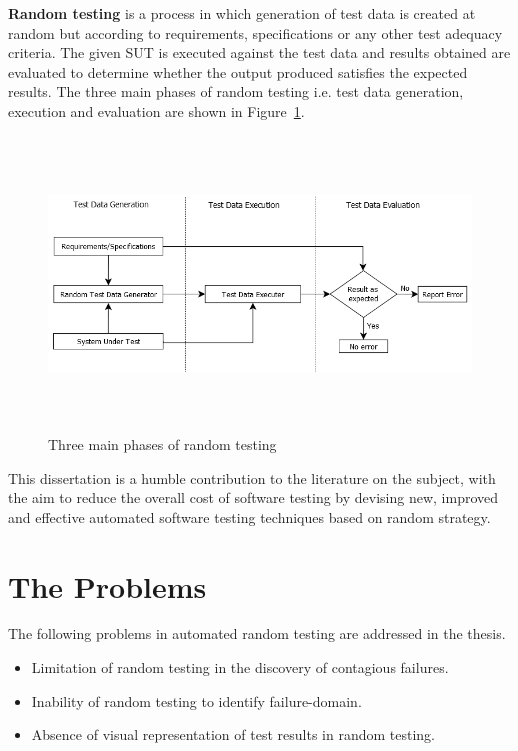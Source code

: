 {\textbf {Random testing}} is a process in which generation of test data is created at random but according to requirements, specifications or any other test adequacy criteria. The given SUT is executed against the test data and results obtained are evaluated to determine whether the output produced satisfies the expected results. The three main phases of random testing i.e. test data generation, execution and evaluation are shown in Figure~\ref{fig:SoftwareTesting1}.
\\
\begin{figure}[h]
	\centering
		\includegraphics[width=15.3cm, height=7.8cm ]{chapter1/SoftwareTesting1.png}
		\caption{Three main phases of random testing}
	\label{fig:SoftwareTesting1}
\end{figure}

This dissertation is a humble contribution to the literature on the subject, with the aim to reduce the overall cost of software testing by devising new, improved and effective automated software testing techniques based on random strategy.

\section{The Problems}
The following problems in automated random testing are addressed in the thesis.
\begin{itemize}
\item Limitation of random testing in the discovery of contagious failures.
\item Inability of random testing to identify failure-domain.
\item Absence of visual representation of test results in random testing. 
\end{itemize}

